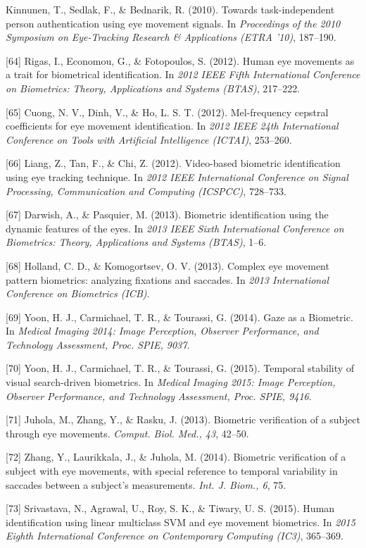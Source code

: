 \documentclass[12pt]{report}
\begin{document}
\begin{raggedright}
[63] Kinnunen, T., Sedlak, F., \& Bednarik, R. (2010). Towards task-independent person authentication using eye movement signals. In \textit{Proceedings of the 2010 Symposium on Eye-Tracking Research \& Applications (ETRA '10)}, 187–190.

[64] Rigas, I., Economou, G., \& Fotopoulos, S. (2012). Human eye movements as a trait for biometrical identification. In \textit{2012 IEEE Fifth International Conference on Biometrics: Theory, Applications and Systems (BTAS)}, 217–222.

[65] Cuong, N. V., Dinh, V., \& Ho, L. S. T. (2012). Mel-frequency cepstral coefficients for eye movement identification. In \textit{2012 IEEE 24th International Conference on Tools with Artificial Intelligence (ICTAI)}, 253–260.

[66] Liang, Z., Tan, F., \& Chi, Z. (2012). Video-based biometric identification using eye tracking technique. In \textit{2012 IEEE International Conference on Signal Processing, Communication and Computing (ICSPCC)}, 728–733.

[67] Darwish, A., \& Pasquier, M. (2013). Biometric identification using the dynamic features of the eyes. In \textit{2013 IEEE Sixth International Conference on Biometrics: Theory, Applications and Systems (BTAS)}, 1–6.

[68] Holland, C. D., \& Komogortsev, O. V. (2013). Complex eye movement pattern biometrics: analyzing fixations and saccades. In \textit{2013 International Conference on Biometrics (ICB)}.

[69] Yoon, H. J., Carmichael, T. R., \& Tourassi, G. (2014). Gaze as a Biometric. In \textit{Medical Imaging 2014: Image Perception, Observer Performance, and Technology Assessment, Proc. SPIE, 9037}. 

[70] Yoon, H. J., Carmichael, T. R., \& Tourassi, G. (2015). Temporal stability of visual search-driven biometrics. In \textit{Medical Imaging 2015: Image Perception, Observer Performance, and Technology Assessment, Proc. SPIE, 9416}.

[71] Juhola, M., Zhang, Y., \& Rasku, J. (2013). Biometric verification of a subject through eye movements. \textit{Comput. Biol. Med., 43}, 42–50.

[72] Zhang, Y., Laurikkala, J., \& Juhola, M. (2014). Biometric verification of a subject with eye movements, with special reference to temporal variability in saccades between a subject's measurements. \textit{Int. J. Biom., 6}, 75.

[73] Srivastava, N., Agrawal, U., Roy, S. K., \& Tiwary, U. S. (2015). Human identification using linear multiclass SVM and eye movement biometrics. In \textit{2015 Eighth International Conference on Contemporary Computing (IC3)}, 365–369.


\end{raggedright}
\end{document}
